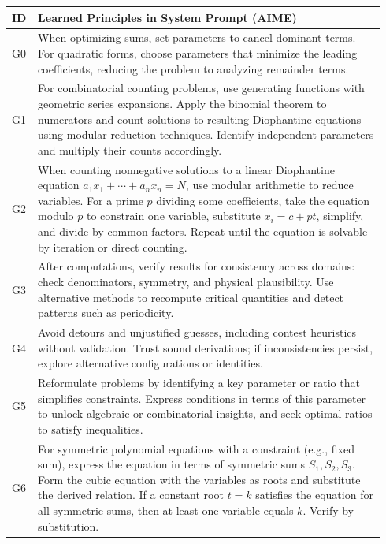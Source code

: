 \documentclass{article}
\theoremstyle{plain}
\theoremstyle{definition}
\theoremstyle{remark}
\begin{document}
\begin{table}[h]
\vspace{15pt}
\centering
\small
\setlength{\tabcolsep}{6pt}
\renewcommand{\arraystretch}{1.4}
\begin{tabular}{p{0.04\linewidth} p{0.9\linewidth}}
\toprule
\textbf{ID} & \textbf{Learned Principles in System Prompt (AIME)} \\
\midrule
G0 & When optimizing sums, set parameters to cancel dominant terms. For quadratic forms, choose parameters that minimize the leading coefficients, reducing the problem to analyzing remainder terms. \\

G1 & For combinatorial counting problems, use generating functions with geometric series expansions. Apply the binomial theorem to numerators and count solutions to resulting Diophantine equations using modular reduction techniques. Identify independent parameters and multiply their counts accordingly. \\

G2 & When counting nonnegative solutions to a linear Diophantine equation \(a_1 x_1 + \cdots + a_n x_n = N\), use modular arithmetic to reduce variables. For a prime \(p\) dividing some coefficients, take the equation modulo \(p\) to constrain one variable, substitute \(x_i = c + p t\), simplify, and divide by common factors. Repeat until the equation is solvable by iteration or direct counting. \\

G3 & After computations, verify results for consistency across domains: check denominators, symmetry, and physical plausibility. Use alternative methods to recompute critical quantities and detect patterns such as periodicity. \\

G4 & Avoid detours and unjustified guesses, including contest heuristics without validation. Trust sound derivations; if inconsistencies persist, explore alternative configurations or identities. \\

G5 & Reformulate problems by identifying a key parameter or ratio that simplifies constraints. Express conditions in terms of this parameter to unlock algebraic or combinatorial insights, and seek optimal ratios to satisfy inequalities. \\

G6 & For symmetric polynomial equations with a constraint (e.g., fixed sum), express the equation in terms of symmetric sums \(S_1, S_2, S_3\). Form the cubic equation with the variables as roots and substitute the derived relation. If a constant root \(t=k\) satisfies the equation for all symmetric sums, then at least one variable equals \(k\). Verify by substitution. \\


\end{tabular}
\end{table}
\end{document}
